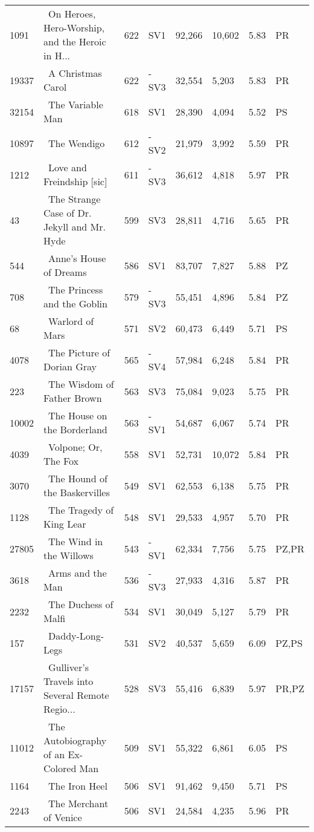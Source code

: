 \begin{longtable}{l | l | l | l | l | l | l | l}
1091 & ~On Heroes, Hero-Worship, and the Heroic in H... & 622 & SV1 & 92,266 & 10,602 & 5.83 & PR\\
19337 & ~A Christmas Carol & 622 & -SV3 & 32,554 & 5,203 & 5.83 & PR\\
32154 & ~The Variable Man & 618 & SV1 & 28,390 & 4,094 & 5.52 & PS\\
10897 & ~The Wendigo & 612 & -SV2 & 21,979 & 3,992 & 5.59 & PR\\
1212 & ~Love and Freindship [sic] & 611 & -SV3 & 36,612 & 4,818 & 5.97 & PR\\
43 & ~The Strange Case of Dr. Jekyll and Mr. Hyde & 599 & SV3 & 28,811 & 4,716 & 5.65 & PR\\
544 & ~Anne's House of Dreams & 586 & SV1 & 83,707 & 7,827 & 5.88 & PZ\\
708 & ~The Princess and the Goblin & 579 & -SV3 & 55,451 & 4,896 & 5.84 & PZ\\
68 & ~Warlord of Mars & 571 & SV2 & 60,473 & 6,449 & 5.71 & PS\\
4078 & ~The Picture of Dorian Gray & 565 & -SV4 & 57,984 & 6,248 & 5.84 & PR\\
223 & ~The Wisdom of Father Brown & 563 & SV3 & 75,084 & 9,023 & 5.75 & PR\\
10002 & ~The House on the Borderland & 563 & -SV1 & 54,687 & 6,067 & 5.74 & PR\\
4039 & ~Volpone; Or, The Fox & 558 & SV1 & 52,731 & 10,072 & 5.84 & PR\\
3070 & ~The Hound of the Baskervilles & 549 & SV1 & 62,553 & 6,138 & 5.75 & PR\\
1128 & ~The Tragedy of King Lear & 548 & SV1 & 29,533 & 4,957 & 5.70 & PR\\
27805 & ~The Wind in the Willows & 543 & -SV1 & 62,334 & 7,756 & 5.75 & PZ,PR\\
3618 & ~Arms and the Man & 536 & -SV3 & 27,933 & 4,316 & 5.87 & PR\\
2232 & ~The Duchess of Malfi & 534 & SV1 & 30,049 & 5,127 & 5.79 & PR\\
157 & ~Daddy-Long-Legs & 531 & SV2 & 40,537 & 5,659 & 6.09 & PZ,PS\\
17157 & ~Gulliver's Travels into Several Remote Regio... & 528 & SV3 & 55,416 & 6,839 & 5.97 & PR,PZ\\
11012 & ~The Autobiography of an Ex-Colored Man & 509 & SV1 & 55,322 & 6,861 & 6.05 & PS\\
1164 & ~The Iron Heel & 506 & SV1 & 91,462 & 9,450 & 5.71 & PS\\
2243 & ~The Merchant of Venice & 506 & SV1 & 24,584 & 4,235 & 5.96 & PR\\

\end{longtable}
